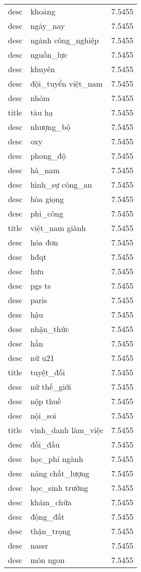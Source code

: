 \documentclass{article}
\begin{document}
\begin{tabular}{lll}
desc & khoảng & 7.5455\\
desc & ngày\_nay & 7.5455\\
desc & ngành công\_nghiệp & 7.5455\\
desc & nguồn\_lực & 7.5455\\
desc & khuyên & 7.5455\\
desc & đội\_tuyển việt\_nam & 7.5455\\
desc & nhóm & 7.5455\\
title & tàu hạ & 7.5455\\
desc & nhượng\_bộ & 7.5455\\
desc & oxy & 7.5455\\
desc & phong\_độ & 7.5455\\
desc & hà\_nam & 7.5455\\
desc & hình\_sự công\_an & 7.5455\\
desc & hòa giọng & 7.5455\\
desc & phi\_công & 7.5455\\
title & việt\_nam giành & 7.5455\\
desc & hóa đơn & 7.5455\\
desc & hđqt & 7.5455\\
desc & hưu & 7.5455\\
desc & pgs ts & 7.5455\\
desc & paris & 7.5455\\
desc & hậu & 7.5455\\
desc & nhận\_thức & 7.5455\\
desc & hẳn & 7.5455\\
desc & nữ u21 & 7.5455\\
title & tuyệt\_đối & 7.5455\\
desc & nữ thế\_giới & 7.5455\\
desc & nộp thuế & 7.5455\\
desc & nội\_soi & 7.5455\\
title & vinh\_danh làm\_việc & 7.5455\\
desc & đối\_đầu & 7.5455\\
desc & học\_phí ngành & 7.5455\\
desc & nâng chất\_lượng & 7.5455\\
desc & học\_sinh trường & 7.5455\\
desc & khám\_chữa & 7.5455\\
desc & động\_đất & 7.5455\\
desc & thận\_trọng & 7.5455\\
desc & nassr & 7.5455\\
desc & món ngon & 7.5455\\

\end{tabular}
\end{document}
